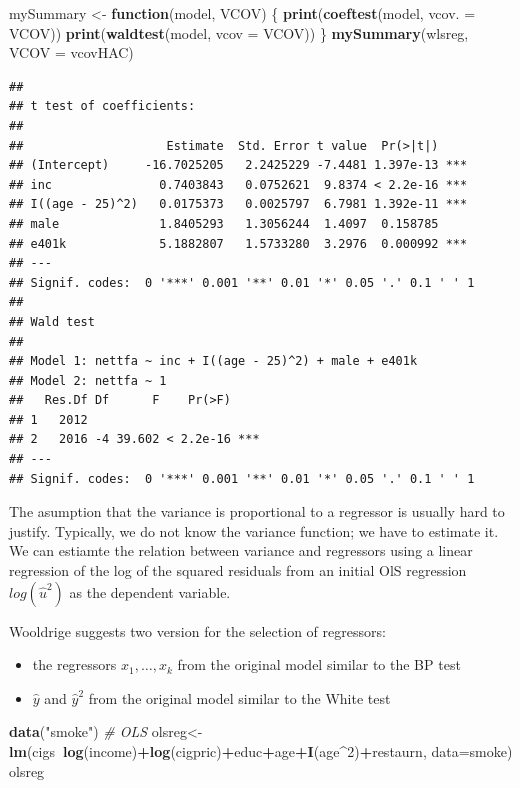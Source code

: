 \documentclass[]{book}
\newenvironment{Shaded}{\begin{snugshade}}{\end{snugshade}}
\newcommand{\CommentTok}[1]{\textcolor[rgb]{0.56,0.35,0.01}{\textit{#1}}}
\newcommand{\ControlFlowTok}[1]{\textcolor[rgb]{0.13,0.29,0.53}{\textbf{#1}}}
\newcommand{\DataTypeTok}[1]{\textcolor[rgb]{0.13,0.29,0.53}{#1}}
\newcommand{\DecValTok}[1]{\textcolor[rgb]{0.00,0.00,0.81}{#1}}
\newcommand{\KeywordTok}[1]{\textcolor[rgb]{0.13,0.29,0.53}{\textbf{#1}}}
\newcommand{\NormalTok}[1]{#1}
\newcommand{\OperatorTok}[1]{\textcolor[rgb]{0.81,0.36,0.00}{\textbf{#1}}}
\newcommand{\StringTok}[1]{\textcolor[rgb]{0.31,0.60,0.02}{#1}}
\providecommand{\tightlist}{%
  \setlength{\itemsep}{0pt}\setlength{\parskip}{0pt}}
\begin{document}
\begin{Shaded}
\begin{Highlighting}[]
\NormalTok{mySummary <-}\StringTok{ }\ControlFlowTok{function}\NormalTok{(model, VCOV) \{}
  \KeywordTok{print}\NormalTok{(}\KeywordTok{coeftest}\NormalTok{(model, }\DataTypeTok{vcov. =}\NormalTok{ VCOV))}
  \KeywordTok{print}\NormalTok{(}\KeywordTok{waldtest}\NormalTok{(model, }\DataTypeTok{vcov =}\NormalTok{ VCOV))}
\NormalTok{\}}
\KeywordTok{mySummary}\NormalTok{(wlsreg, }\DataTypeTok{VCOV =}\NormalTok{ vcovHAC)}
\end{Highlighting}
\end{Shaded}

\begin{verbatim}
## 
## t test of coefficients:
## 
##                    Estimate  Std. Error t value  Pr(>|t|)    
## (Intercept)     -16.7025205   2.2425229 -7.4481 1.397e-13 ***
## inc               0.7403843   0.0752621  9.8374 < 2.2e-16 ***
## I((age - 25)^2)   0.0175373   0.0025797  6.7981 1.392e-11 ***
## male              1.8405293   1.3056244  1.4097  0.158785    
## e401k             5.1882807   1.5733280  3.2976  0.000992 ***
## ---
## Signif. codes:  0 '***' 0.001 '**' 0.01 '*' 0.05 '.' 0.1 ' ' 1
## 
## Wald test
## 
## Model 1: nettfa ~ inc + I((age - 25)^2) + male + e401k
## Model 2: nettfa ~ 1
##   Res.Df Df      F    Pr(>F)    
## 1   2012                        
## 2   2016 -4 39.602 < 2.2e-16 ***
## ---
## Signif. codes:  0 '***' 0.001 '**' 0.01 '*' 0.05 '.' 0.1 ' ' 1
\end{verbatim}

The asumption that the variance is proportional to a regressor is
usually hard to justify. Typically, we do not know the variance
function; we have to estimate it. We can estiamte the relation between
variance and regressors using a linear regression of the log of the
squared residuals from an initial OlS regression \(log(\hat{u}^{2})\) as
the dependent variable.

Wooldrige suggests two version for the selection of regressors:

\begin{itemize}
\tightlist
\item
  the regressors \(x_1, \dots , x_k\) from the original model similar to
  the BP test
\item
  \(\hat{y}\) and \(\hat{y}^{2}\) from the original model similar to the
  White test
\end{itemize}

\begin{Shaded}
\begin{Highlighting}[]
\KeywordTok{data}\NormalTok{(}\StringTok{"smoke"}\NormalTok{)}
\CommentTok{# OLS}
\NormalTok{olsreg<-}\KeywordTok{lm}\NormalTok{(cigs}\OperatorTok{~}\KeywordTok{log}\NormalTok{(income)}\OperatorTok{+}\KeywordTok{log}\NormalTok{(cigpric)}\OperatorTok{+}\NormalTok{educ}\OperatorTok{+}\NormalTok{age}\OperatorTok{+}\KeywordTok{I}\NormalTok{(age}\OperatorTok{^}\DecValTok{2}\NormalTok{)}\OperatorTok{+}\NormalTok{restaurn, }
           \DataTypeTok{data=}\NormalTok{smoke)}
\NormalTok{olsreg}
\end{Highlighting}
\end{Shaded}
\end{document}
